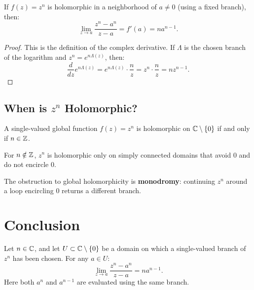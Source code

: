 \begin{theorem}
If $f(z) = z^n$ is holomorphic in a neighborhood of $a \neq 0$ (using a fixed branch), then:
\begin{equation}
\lim_{z \to a} \frac{z^n - a^n}{z - a} = f'(a) = n a^{n-1}.
\end{equation}
\end{theorem}

\begin{proof}
This is the definition of the complex derivative. If $\Lambda$ is the chosen
branch of the logarithm and $z^n = e^{n\Lambda(z)}$, then:
\begin{equation}
\frac{d}{dz} e^{n\Lambda(z)} = e^{n\Lambda(z)} \cdot \frac{n}{z} = z^n \cdot \frac{n}{z} = n z^{n-1}.
\end{equation}
\end{proof}

\subsection{When is $z^n$ Holomorphic?}

\begin{proposition}
A single-valued global function $f(z) = z^n$ is holomorphic on $\mathbb{C} \setminus \{0\}$ if and only if $n \in \mathbb{Z}$.

For $n \notin \mathbb{Z}$, $z^n$ is holomorphic only on simply connected domains that avoid $0$ and do not encircle $0$.
\end{proposition}

\begin{remark}
The obstruction to global holomorphicity is \textbf{monodromy}: continuing $z^n$ around a loop encircling $0$ returns a different branch.
\end{remark}

\section{Conclusion}

\begin{theorem}
Let $n \in \mathbb{C}$, and let $U \subset \mathbb{C} \setminus \{0\}$ be a domain on which a
single-valued branch of $z^n$ has been chosen. For any $a \in U$:
\begin{equation}
\boxed{\lim_{z \to a} \frac{z^n - a^n}{z - a} = n a^{n-1}.}
\end{equation}
Here both $a^n$ and $a^{n-1}$ are evaluated using the same branch.
\end{theorem}

